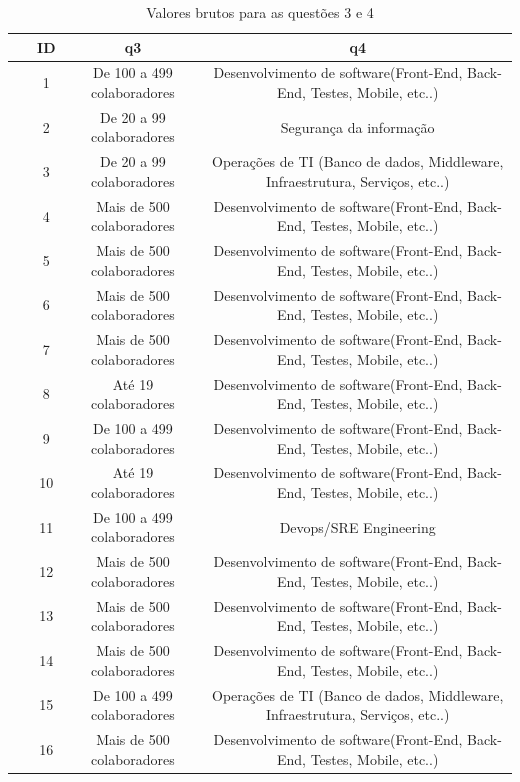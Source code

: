 \documentclass[twoside,english,brazilian]{UNISINOSartigo}
\begin{document}
\begin{table}[h]
\footnotesize
    \caption{Valores brutos para as questões 3 e 4}
    \begin{tabularx}{\columnwidth}{cccc}
    \hline
        ~ & ID & q3 & q4 \\ \hline
~ & 1 & De 100 a 499 colaboradores & Desenvolvimento de software(Front-End, Back-End, Testes, Mobile, etc..) \\
~ & 2 & De 20 a 99 colaboradores & Segurança da informação \\
~ & 3 & De 20 a 99 colaboradores & Operações de TI (Banco de dados, Middleware, Infraestrutura, Serviços, etc..) \\
~ & 4 & Mais de 500 colaboradores & Desenvolvimento de software(Front-End, Back-End, Testes, Mobile, etc..) \\
~ & 5 & Mais de 500 colaboradores & Desenvolvimento de software(Front-End, Back-End, Testes, Mobile, etc..) \\
~ & 6 & Mais de 500 colaboradores & Desenvolvimento de software(Front-End, Back-End, Testes, Mobile, etc..) \\
~ & 7 & Mais de 500 colaboradores & Desenvolvimento de software(Front-End, Back-End, Testes, Mobile, etc..) \\
~ & 8 & Até 19 colaboradores & Desenvolvimento de software(Front-End, Back-End, Testes, Mobile, etc..) \\
~ & 9 & De 100 a 499 colaboradores & Desenvolvimento de software(Front-End, Back-End, Testes, Mobile, etc..) \\
~ & 10 & Até 19 colaboradores & Desenvolvimento de software(Front-End, Back-End, Testes, Mobile, etc..) \\
~ & 11 & De 100 a 499 colaboradores & Devops/SRE Engineering \\
~ & 12 & Mais de 500 colaboradores & Desenvolvimento de software(Front-End, Back-End, Testes, Mobile, etc..) \\
~ & 13 & Mais de 500 colaboradores & Desenvolvimento de software(Front-End, Back-End, Testes, Mobile, etc..) \\
~ & 14 & Mais de 500 colaboradores & Desenvolvimento de software(Front-End, Back-End, Testes, Mobile, etc..) \\
~ & 15 & De 100 a 499 colaboradores & Operações de TI (Banco de dados, Middleware, Infraestrutura, Serviços, etc..) \\
~ & 16 & Mais de 500 colaboradores & Desenvolvimento de software(Front-End, Back-End, Testes, Mobile, etc..) \\

\end{tabularx}
\end{table}
\end{document}
